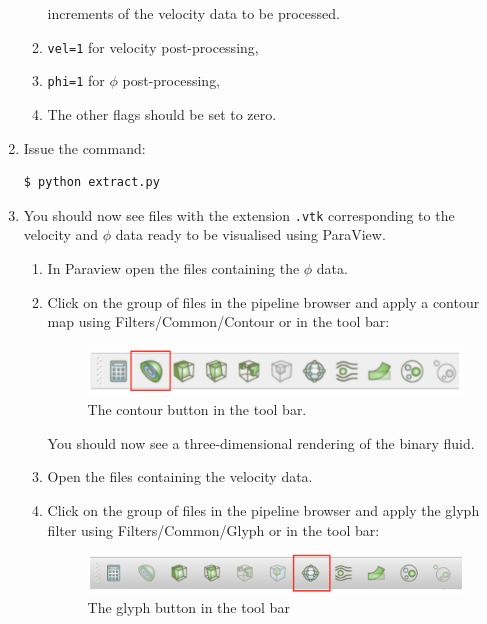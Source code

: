 \documentclass[11pt,twoside,a4paper]{article}
\begin{document}
\begin{enumerate}
\begin{enumerate}
increments of the velocity data
to be processed.
\item \texttt{vel=1} for velocity post-processing, 
\item \texttt{phi=1} for $\phi$ post-processing,
\item The other flags should be set to zero. 
\end{enumerate}
\item Issue the command:
\begin{lstlisting}
$ python extract.py
\end{lstlisting}
\item You should now see files with the extension \texttt{.vtk} corresponding to the velocity 
and $\phi$ data ready to be visualised using ParaView.
\begin{enumerate}
\item In Paraview open the files containing the $\phi$ data.
\item Click on the group of files in the pipeline browser and apply a contour map using 
Filters/Common/Contour or in the tool bar: 

\begin{figure}[H]
\begin{center}
\includegraphics[width=0.8\linewidth]{contour.png}
  \caption{The contour button in the tool bar.}
  \label{fig:contour}
  \end{center}
\end{figure}

You should now see a three-dimensional rendering of the binary fluid.
\item Open the files containing the velocity data.
\item Click on the group of files in the pipeline browser and apply the glyph filter using 
Filters/Common/Glyph or in the tool bar: 

\begin{figure}[H]
\begin{center}
\includegraphics[width=0.8\linewidth]{glyph.png}
  \caption{The glyph button in the tool bar}
  \label{fig:glyph}
  \end{center}
\end{figure}


\end{enumerate}
\end{enumerate}
\end{document}
